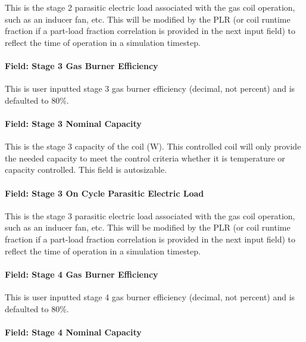 This is the stage 2 parasitic electric load associated with the gas coil operation, such as an inducer fan, etc. This will be modified by the PLR (or coil runtime fraction if a part-load fraction correlation is provided in the next input field) to reflect the time of operation in a simulation timestep.

\paragraph{Field: Stage 3 Gas Burner Efficiency}\label{field-stage-3-gas-burner-efficiency}

This is user inputted stage 3 gas burner efficiency (decimal, not percent) and is defaulted to 80\%.

\paragraph{Field: Stage 3 Nominal Capacity}\label{field-stage-3-nominal-capacity-1}

This is the stage 3 capacity of the coil (W). This controlled coil will only provide the needed capacity to meet the control criteria whether it is temperature or capacity controlled. This field is autosizable.

\paragraph{Field: Stage 3 On Cycle Parasitic Electric Load}\label{field-stage-3-parasitic-electric-load}

This is the stage 3 parasitic electric load associated with the gas coil operation, such as an inducer fan, etc. This will be modified by the PLR (or coil runtime fraction if a part-load fraction correlation is provided in the next input field) to reflect the time of operation in a simulation timestep.

\paragraph{Field: Stage 4 Gas Burner Efficiency}\label{field-stage-4-gas-burner-efficiency}

This is user inputted stage 4 gas burner efficiency (decimal, not percent) and is defaulted to 80\%.

\paragraph{Field: Stage 4 Nominal Capacity}\label{field-stage-4-nominal-capacity-1}

